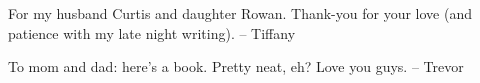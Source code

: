 
\thispagestyle{empty}

\begin{center}
For my husband Curtis and daughter Rowan. Thank-you for your love 
\linebreak(and patience with my late night writing).
\linebreak-- Tiffany

To mom and dad: here's a book. Pretty neat, eh? Love you guys.
\linebreak-- Trevor
\end{center}

\setlength{\abovedisplayskip}{-5pt}
\setlength{\abovedisplayshortskip}{-5pt}
